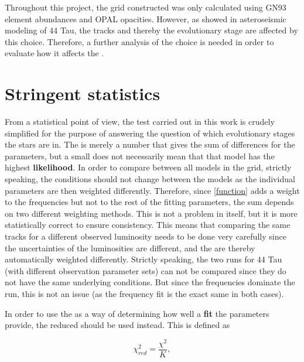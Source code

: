 
Throughout this project, the grid constructed was only calculated using GN93 element abundances and OPAL opacities. However, as \citet{lenz2010delta} showed in asteroseismic modeling of 44 Tau,  the tracks and thereby the evolutionary stage are affected by this choice. Therefore, a further analysis of the choice is needed in order to evaluate how it affects the \chis.  


\section{Stringent statistics}

From a statistical point of view, the \chis test carried out in this work is crudely simplified for the purpose of answering the question of which evolutionary stages the stars are in. The \chis is merely a number that gives the sum of differences for the parameters, but a small \chis does not necessarily mean that that model has the highest \textbf{likelihood}. In order to compare \chis between all models in the grid, strictly speaking, the conditions should not change between the models as the individual parameters are then weighted differently. Therefore, since \eqref{function} adds a weight to the frequencies but not to the rest of the fitting parameters, the \chis sum depends on two different weighting methods. This is not a problem in itself, but it is more statistically correct to ensure consistency.  This means that comparing the same tracks for a different observed luminosity needs to be done very carefully since the uncertainties of the luminosities are different, and the \chis are thereby automatically weighted differently. Strictly speaking, the two runs for 44 Tau (with different observation parameter sets) can not be compared since they do not have the same underlying conditions. But since the frequencies dominate the run, this is not an issue (as the frequency fit is the exact same in both cases). 

In order to use the \chis as a way of determining how well a \textbf{fit} the parameters provide,  the reduced \chis should be used instead. This is defined as 

\begin{equation}
	\chi_{red}^2 = \frac{\chi^2}{K} ,
\end{equation}

